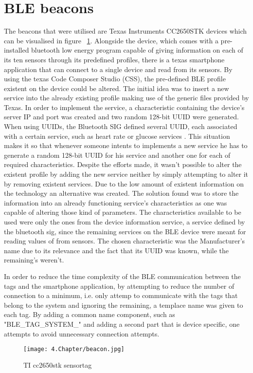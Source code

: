 \section{ \ac{BLE} beacons}
\label{sec:beacon}


The beacons that were utilised are Texas Instruments CC2650STK devices which can be visualised in figure ~\ref{fig:beacon}. Alongside the device, which comes with a pre-installed bluetooth low energy program capable of giving information on each of its ten sensors through its predefined profiles, there is a texas smartphone application that can connect to a single device and read from its sensors. By using the texas Code Composer Studio (CSS), the pre-defined \ac{BLE} profile existent on the device could be altered.
The initial idea was to insert a new service into the already existing profile making use of the generic files provided by Texas. 
In order to implement the service, a characteristic containing the device's server IP and port was created and two random 128-bit UUID were generated. When using UUIDs, the Bluetooth SIG defined several UUID, each associated with a certain service, such as heart rate or glucose services \cite{bleservices}. This situation makes it so that whenever someone intents to implements a new service he has to generate a random 128-bit UUID for his service and another one for each of required characteristics.
Despite the efforts made, it wasn't possible to alter the existent profile by adding the new service neither by simply attempting to alter it by removing existent services. Due to the low amount of existent information on the technology an alternative was created. The solution found was to store the information into an already functioning service's characteristics as one was capable of altering those kind of parameters. The characteristics available to be used were only the ones from the device information service, a service defined by the bluetooth sig, since the remaining services on the \ac{BLE} device were meant for reading values of from sensors. The chosen characteristic was the Manufacturer's name due to its relevance and the fact that its UUID was known, while the remaining's weren't.

In order to reduce the time complexity of the \ac{BLE} communication between the tags and the smartphone application, by attempting to reduce the number of connection to a minimum, i.e. only attemp to communicate with the tags that belong to the system and ignoring the remaining, a templace name was given to each tag. By adding a common name component, such as "BLE_TAG_SYSTEM_" and adding a second part that is device specific, one attempts to avoid unnecessary connection attempts.


\begin{figure}
	\centering
		\texttt{[image: 4.Chapter/beacon.jpg]}
	\caption[TI cc2650stk sensortag]{TI cc2650stk sensortag}
	\label{fig:beacon}
\end{figure}
